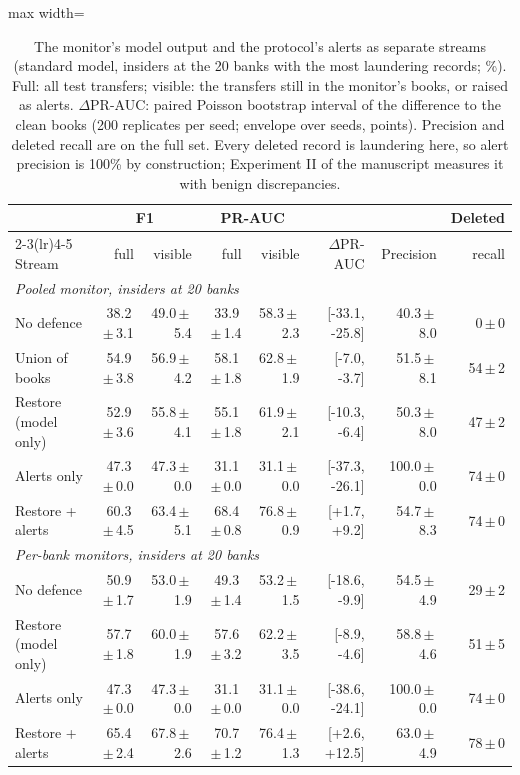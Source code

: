 \begin{table}[!htbp]\centering\small
\caption{The monitor's model output and the protocol's alerts as separate streams (standard model, insiders at the 20 banks with the most laundering records; \%). Full: all test transfers; visible: the transfers still in the monitor's books, or raised as alerts. $\Delta$PR-AUC: paired Poisson bootstrap interval of the difference to the clean books (200 replicates per seed; envelope over seeds, points). Precision and deleted recall are on the full set. Every deleted record is laundering here, so alert precision is 100\% by construction; Experiment II of the manuscript measures it with benign discrepancies.}\label{tab:amlstreams}
\begin{adjustbox}{max width=\linewidth}\begin{tabular}{lrrrrrrr}\toprule
 & \multicolumn{2}{c}{F1} & \multicolumn{2}{c}{PR-AUC} & & & Deleted \\\cmidrule(lr){2-3}\cmidrule(lr){4-5}
Stream & full & visible & full & visible & $\Delta$PR-AUC & Precision & recall \\\midrule
\multicolumn{8}{l}{\emph{Pooled monitor, insiders at 20 banks}} \\
No defence & 38.2\,$\pm$\,3.1 & 49.0\,$\pm$\,5.4 & 33.9\,$\pm$\,1.4 & 58.3\,$\pm$\,2.3 & [-33.1, -25.8] & 40.3\,$\pm$\,8.0 & 0\,$\pm$\,0 \\
Union of books & 54.9\,$\pm$\,3.8 & 56.9\,$\pm$\,4.2 & 58.1\,$\pm$\,1.8 & 62.8\,$\pm$\,1.9 & [-7.0, -3.7] & 51.5\,$\pm$\,8.1 & 54\,$\pm$\,2 \\
Restore (model only) & 52.9\,$\pm$\,3.6 & 55.8\,$\pm$\,4.1 & 55.1\,$\pm$\,1.8 & 61.9\,$\pm$\,2.1 & [-10.3, -6.4] & 50.3\,$\pm$\,8.0 & 47\,$\pm$\,2 \\
Alerts only & 47.3\,$\pm$\,0.0 & 47.3\,$\pm$\,0.0 & 31.1\,$\pm$\,0.0 & 31.1\,$\pm$\,0.0 & [-37.3, -26.1] & 100.0\,$\pm$\,0.0 & 74\,$\pm$\,0 \\
Restore + alerts & 60.3\,$\pm$\,4.5 & 63.4\,$\pm$\,5.1 & 68.4\,$\pm$\,0.8 & 76.8\,$\pm$\,0.9 & [+1.7, +9.2] & 54.7\,$\pm$\,8.3 & 74\,$\pm$\,0 \\
\multicolumn{8}{l}{\emph{Per-bank monitors, insiders at 20 banks}} \\
No defence & 50.9\,$\pm$\,1.7 & 53.0\,$\pm$\,1.9 & 49.3\,$\pm$\,1.4 & 53.2\,$\pm$\,1.5 & [-18.6, -9.9] & 54.5\,$\pm$\,4.9 & 29\,$\pm$\,2 \\
Restore (model only) & 57.7\,$\pm$\,1.8 & 60.0\,$\pm$\,1.9 & 57.6\,$\pm$\,3.2 & 62.2\,$\pm$\,3.5 & [-8.9, -4.6] & 58.8\,$\pm$\,4.6 & 51\,$\pm$\,5 \\
Alerts only & 47.3\,$\pm$\,0.0 & 47.3\,$\pm$\,0.0 & 31.1\,$\pm$\,0.0 & 31.1\,$\pm$\,0.0 & [-38.6, -24.1] & 100.0\,$\pm$\,0.0 & 74\,$\pm$\,0 \\
Restore + alerts & 65.4\,$\pm$\,2.4 & 67.8\,$\pm$\,2.6 & 70.7\,$\pm$\,1.2 & 76.4\,$\pm$\,1.3 & [+2.6, +12.5] & 63.0\,$\pm$\,4.9 & 78\,$\pm$\,0 \\
\bottomrule\end{tabular}\end{adjustbox}\end{table}